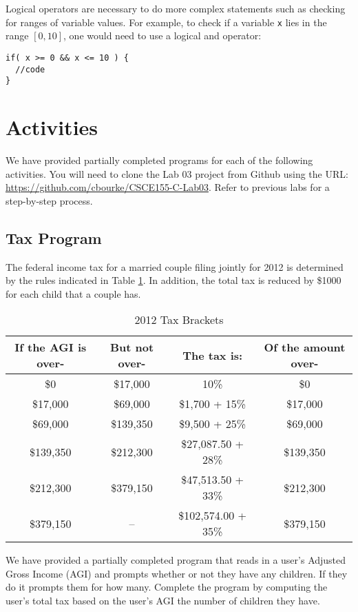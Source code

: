 \documentclass[12pt]{scrartcl}
\begin{document}
Logical operators are necessary to do more complex statements such as 
checking for ranges of variable values.  For example, to check if a variable 
\texttt{x} lies in the range $[0, 10]$, one would need to use a logical and operator:

\begin{verbatim}
if( x >= 0 && x <= 10 ) { 
  //code
}
\end{verbatim}

\section{Activities}

We have provided partially completed programs for each of the following 
activities.  You will need to clone the Lab 03 project from Github using the URL:
\url{https://github.com/cbourke/CSCE155-C-Lab03}.  Refer to previous
labs for a step-by-step process.

\subsection{Tax Program}

The federal income tax for a married couple filing jointly for 2012 is determined 
by the rules indicated in Table \ref{table:taxBrackets}.  In addition, the total tax is reduced by 
\$1000 for each child that a couple has.  

\begin{table}
\centering
\begin{tabular}{c|c|c|c}
If the AGI is over- & But not over- & The tax is: & Of the amount over- \\
\hline\hline
\$0 & \$17,000 & 10\% & \$0 \\
\$17,000 & \$69,000 & \$1,700 + 15\% & \$17,000 \\
\$69,000 & \$139,350 & \$9,500 + 25\% & \$69,000 \\
\$139,350 & \$212,300 & \$27,087.50 + 28\% & \$139,350 \\
\$212,300 & \$379,150 & \$47,513.50 + 33\% & \$212,300 \\
\$379,150 & --  & \$102,574.00 + 35\% & \$379,150 \\
\end{tabular}
\caption{2012 Tax Brackets}
\label{table:taxBrackets}
\end{table}

We have provided a partially completed program that reads in a user's 
Adjusted Gross Income (AGI) and prompts whether or not they have 
any children.  If they do it prompts them for how many.  Complete
the program by computing the user's total tax based on the user's AGI 
the number of children they have.
\end{document}
